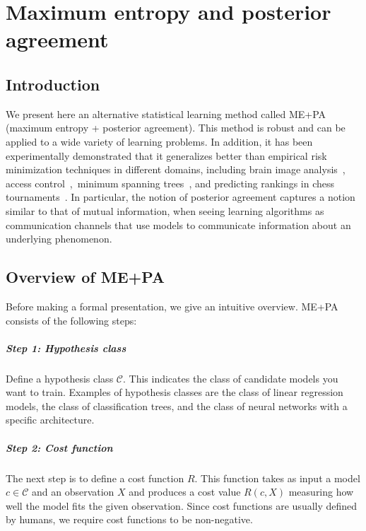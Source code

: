 \chapter{Maximum entropy and posterior agreement}

\section{Introduction}
\label{sec:intro}

We present here an alternative statistical learning method called ME+PA (maximum entropy + posterior agreement). This method is robust and can be applied to a wide variety of learning problems. In addition, it has been experimentally demonstrated that it generalizes better than empirical risk minimization techniques in different domains, including brain image analysis~\cite{gorbach2018pipeline, wegmayr2020entrack}, access control~\cite{frank2009probabilistic, cotrini2019next},~minimum spanning trees~\cite{gronskiy2014informative}, and predicting rankings in chess tournaments~\cite{busse2013approximate}. In particular, the notion of posterior agreement captures a notion similar to that of mutual information, when seeing learning algorithms as communication channels that use models to communicate information about an underlying phenomenon.

\section{Overview of ME+PA}
\label{sec:overview}

Before making a formal presentation, we give an intuitive overview. ME+PA consists of the following steps:

\paragraph{Step 1: Hypothesis class} Define a hypothesis class $\mathcal{C}$. This indicates the class of candidate models you want to train. Examples of hypothesis classes are the class of linear regression models, the class of classification trees, and the class of neural networks with a specific architecture.

\paragraph{Step 2: Cost function} The next step is to define a cost function $R$. This function takes as input a model $c \in \mathcal{C}$ and an observation $X$ and produces a cost value $R(c, X)$ measuring how well the model fits the given observation. Since cost functions are usually defined by humans, we require cost functions to be non-negative.

